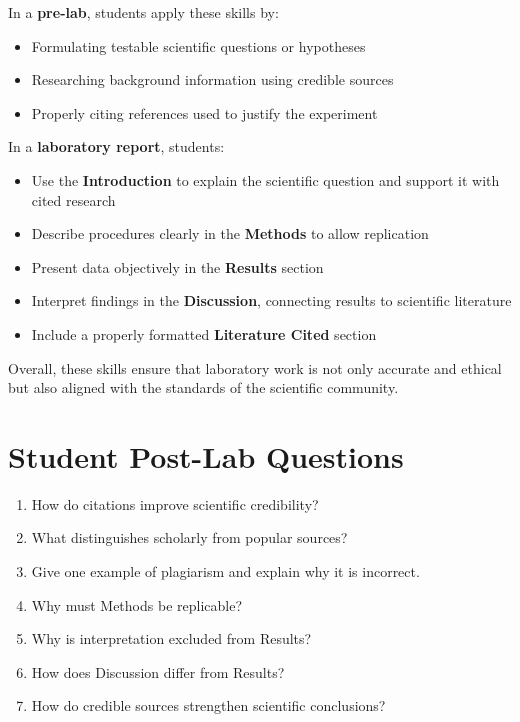 \documentclass[
  letterpaper,
  DIV=11,
  numbers=noendperiod]{scrreprt}
\begin{document}

In a \textbf{pre-lab}, students apply these skills by:

\begin{itemize}
\item
  Formulating testable scientific questions or hypotheses
\item
  Researching background information using credible sources
\item
  Properly citing references used to justify the experiment
\end{itemize}

In a \textbf{laboratory report}, students:

\begin{itemize}
\item
  Use the \textbf{Introduction} to explain the scientific question and
  support it with cited research
\item
  Describe procedures clearly in the \textbf{Methods} to allow
  replication
\item
  Present data objectively in the \textbf{Results} section
\item
  Interpret findings in the \textbf{Discussion}, connecting results to
  scientific literature
\item
  Include a properly formatted \textbf{Literature Cited} section
\end{itemize}

Overall, these skills ensure that laboratory work is not only accurate
and ethical but also aligned with the standards of the scientific
community.

\section*{\texorpdfstring{\textbf{Student Post-Lab
Questions}}{Student Post-Lab Questions}}\label{student-post-lab-questions}


\begin{enumerate}
\def\labelenumi{\arabic{enumi}.}
\item
  How do citations improve scientific credibility?
\item
  What distinguishes scholarly from popular sources?
\item
  Give one example of plagiarism and explain why it is incorrect.
\item
  Why must Methods be replicable?
\item
  Why is interpretation excluded from Results?
\item
  How does Discussion differ from Results?
\item
  How do credible sources strengthen scientific conclusions?
\end{enumerate}
\end{document}
